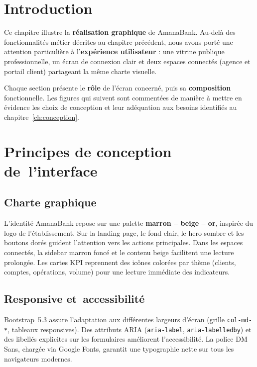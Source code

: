 \documentclass[11pt,a4paper,oneside]{report}
\newcommand{\nomapplication}{AmanaBank}
\begin{document}
\section{Introduction}

Ce chapitre illustre la \textbf{réalisation graphique} de \nomapplication. Au-delà des fonctionnalités métier décrites au chapitre précédent, nous avons porté une attention particulière à l'\textbf{expérience utilisateur} : une vitrine publique professionnelle, un écran de connexion clair et deux espaces connectés (agence et portail client) partageant la même charte visuelle.

Chaque section présente le \textbf{rôle} de l'écran concerné, puis sa \textbf{composition} fonctionnelle. Les figures qui suivent sont commentées de manière à mettre en évidence les choix de conception et leur adéquation aux besoins identifiés au chapitre~\ref{ch:conception}.

\section{Principes de conception de~l'interface}

\subsection{Charte graphique}

L'identité AmanaBank repose sur une palette \textbf{marron -- beige -- or}, inspirée du logo de l'établissement. Sur la landing page, le fond clair, le hero sombre et les boutons dorés guident l'attention vers les actions principales. Dans les espaces connectés, la sidebar marron foncé et le contenu beige facilitent une lecture prolongée. Les cartes KPI reprennent des icônes colorées par thème (clients, comptes, opérations, volume) pour une lecture immédiate des indicateurs.

\subsection{Responsive et~accessibilité}

Bootstrap~5.3 assure l'adaptation aux différentes largeurs d'écran (grille \texttt{col-md-*}, tableaux responsives). Des attributs ARIA (\texttt{aria-label}, \texttt{aria-labelledby}) et des libellés explicites sur les formulaires améliorent l'accessibilité. La police DM Sans, chargée via Google Fonts, garantit une typographie nette sur tous les navigateurs modernes.
\end{document}
